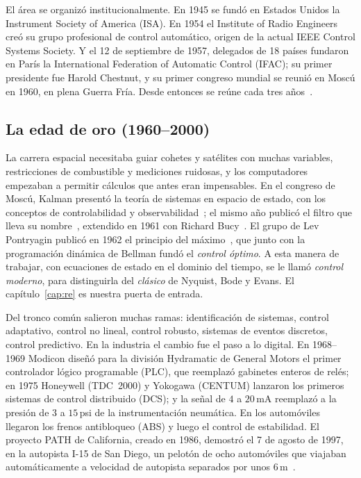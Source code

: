 El área se organizó institucionalmente. En 1945 se fundó en Estados Unidos la Instrument Society of America (ISA). En 1954 el Institute of Radio Engineers creó su grupo profesional de control automático, origen de la actual IEEE Control Systems Society. Y el 12 de septiembre de 1957, delegados de 18 países fundaron en París la International Federation of Automatic Control (IFAC); su primer presidente fue Harold Chestnut, y su primer congreso mundial se reunió en Moscú en 1960, en plena Guerra Fría. Desde entonces se reúne cada tres años~\citep{IFAChist,Bis09}.

\subsection{La edad de oro (1960--2000)}

La carrera espacial necesitaba guiar cohetes y satélites con muchas variables, restricciones de combustible y mediciones ruidosas, y los computadores empezaban a permitir cálculos que antes eran impensables. En el congreso de Moscú, Kalman presentó la teoría de sistemas en espacio de estado, con los conceptos de controlabilidad y observabilidad~\citep{Kal60}; el mismo año publicó el filtro que lleva su nombre~\citep{Kal60b}, extendido en 1961 con Richard Bucy~\citep{KaBu61}. El grupo de Lev Pontryagin publicó en 1962 el principio del máximo~\citep{Pon62}, que junto con la programación dinámica de Bellman fundó el \emph{control óptimo}. A esta manera de trabajar, con ecuaciones de estado en el dominio del tiempo, se le llamó \emph{control moderno}, para distinguirla del \emph{clásico} de Nyquist, Bode y Evans. El capítulo~\ref{cap:re} es nuestra puerta de entrada.

Del tronco común salieron muchas ramas: identificación de sistemas, control adaptativo, control no lineal, control robusto, sistemas de eventos discretos, control predictivo. En la industria el cambio fue el paso a lo digital. En 1968--1969 Modicon diseñó para la división Hydramatic de General Motors el primer controlador lógico programable (PLC), que reemplazó gabinetes enteros de relés; en 1975 Honeywell (TDC~2000) y Yokogawa (CENTUM) lanzaron los primeros sistemas de control distribuido (DCS); y la señal de $4$ a $20$\,mA reemplazó a la presión de $3$ a $15$\,psi de la instrumentación neumática. En los automóviles llegaron los frenos antibloqueo (ABS) y luego el control de estabilidad. El proyecto PATH de California, creado en 1986, demostró el 7 de agosto de 1997, en la autopista I-15 de San Diego, un pelotón de ocho automóviles que viajaban automáticamente a velocidad de autopista separados por unos $6$\,m~\citep{PATH97}.

